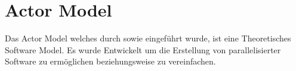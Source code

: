 \chapter{Actor Model}
Das Actor Model welches durch \cite{hewitt1973session} sowie \cite{Agha1985Actors:Systems.} eingeführt wurde, ist eine Theoretisches Software Model. Es wurde Entwickelt um die Erstellung von parallelisierter Software zu ermöglichen beziehungsweise zu vereinfachen. 